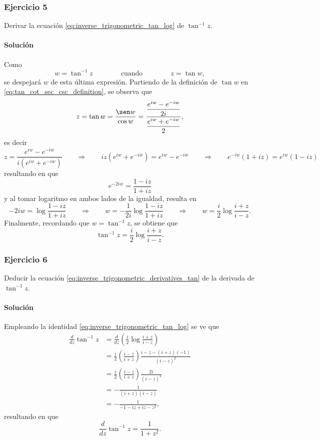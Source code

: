 \documentclass[a4paper]{report}
\begin{document}
\subsubsection{Ejercicio 5}

Derivar la ecuación \ref{eq:inverse_trigonometric_tan_log} de \(\tan^{-1}z\).

\paragraph{Solución} Como
\[
 w=\tan^{-1}z
 \qquad\qquad\textrm{cuando}\qquad\qquad
 z=\tan w,
\]
se despejará \(w\) de esta última expresión. Partiendo de la definición de \(\tan w\) en  \ref{eq:tan_cot_sec_csc_definition}, se observa que 
\[
 z=\tan w=\frac{\sen w}{\cos w}=\dfrac{\dfrac{e^{iw}-e^{-iw}}{2i}}{\dfrac{e^{iw}+e^{-iw}}{2}},
\]
es decir
\[
 z=\frac{e^{iw}-e^{-iw}}{i(e^{iw}+e^{-iw})}
 \qquad\Rightarrow\qquad 
 iz(e^{iw}+e^{-iw})=e^{iw}-e^{-iw}
 \qquad\Rightarrow\qquad 
 e^{-iw}(1+iz)=e^{iw}(1-iz)
\]
resultando en que 
\[
 e^{-2iw}=\frac{1-iz}{1+iz}
\]
y al tomar logaritmo en ambos lados de la igualdad, resulta en
\[
 -2iw=\log\frac{1-iz}{1+iz}
 \qquad\Rightarrow\qquad 
 w=-\frac{1}{2i}\log\frac{1-iz}{1+iz}
 \qquad\Rightarrow\qquad 
 w=\frac{i}{2}\log\frac{i+z}{i-z}.
\]
Finalmente, recordando que \(w=\tan^{-1}z\), se obtiene que 
\[
 \tan^{-1}z=\frac{i}{2}\log\frac{i+z}{i-z}.
\]

\subsubsection{Ejercicio 6}

Deducir la ecuación \ref{eq:inverse_trigonometric_derivatives_tan} de la derivada de \(\tan^{-1}z\).

\paragraph{Solución} Empleando la identidad \ref{eq:inverse_trigonometric_tan_log} se ve que 
\begin{align*}
 \frac{d}{dz}\tan^{-1}z&=\frac{d}{dz}\left(\frac{i}{2}\log\frac{i+z}{i-z}\right)\\
   &=\frac{i}{2}\left(\frac{i-z}{i+z}\right)\frac{i-z-(i+z)(-1)}{(i-z)^2}\\
   &=\frac{i}{2}\left(\frac{i-z}{i+z}\right)\frac{2i}{(i-z)^2}\\
   &=-\frac{1}{(i+z)(i-z)}\\
   &=-\frac{1}{-1-iz+iz-z^2},
\end{align*}
resultando en que 
\[
 \frac{d}{dz}\tan^{-1}z=\frac{1}{1+z^2}.
\]
\end{document}
